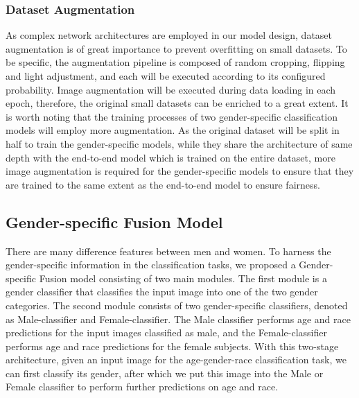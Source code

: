 \documentclass[DIV=calc, paper=a4, fontsize=10pt, twocolumn]{article}
\begin{document}
	\subsubsection{Dataset Augmentation}
	As complex network architectures are employed in our model design, dataset augmentation is of great importance to prevent overfitting on small datasets. To be specific, the augmentation pipeline is composed of random cropping, flipping and light adjustment, and each will be executed according to its configured probability. Image augmentation will be executed during data loading in each epoch, therefore, the original small datasets can be enriched to a great extent. It is worth noting that the training processes of two gender-specific classification models will employ more augmentation. As the original dataset will be split in half to train the gender-specific models, while they share the architecture of same depth with the end-to-end model which is trained on the entire dataset, more image augmentation is required for the gender-specific models to ensure that they are trained to the same extent as the end-to-end model to ensure fairness. 
	
	\subsection{Gender-specific Fusion Model}
	There are many difference features between men and women. To harness the gender-specific information in the classification tasks, we proposed a Gender-specific Fusion model consisting of two main modules. The first module is a gender classifier that classifies the input image into one of the two gender categories. The second module consists of two gender-specific classifiers, denoted as Male-classifier and Female-classifier. The Male classifier performs age and race predictions for the input images classified as male, and the Female-classifier performs age and race predictions for the female subjects. With this two-stage architecture, given an input image for the age-gender-race classification task, we can first classify its gender, after which we put this image into the Male or Female classifier to perform further predictions on age and race. 
	
\end{document}
